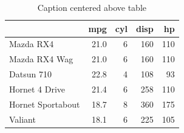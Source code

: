 \documentclass[
  authoryear,
  preprint,
  3p,
  twocolumn]{elsarticle}
\begin{document}
\begin{longtable}[]{@{}lrrrr@{}}

\caption{\label{tbl-simple}Caption centered above table}

\tabularnewline

\toprule\noalign{}
& mpg & cyl & disp & hp \\
\midrule\noalign{}
\endhead
\bottomrule\noalign{}
\endlastfoot
Mazda RX4 & 21.0 & 6 & 160 & 110 \\
Mazda RX4 Wag & 21.0 & 6 & 160 & 110 \\
Datsun 710 & 22.8 & 4 & 108 & 93 \\
Hornet 4 Drive & 21.4 & 6 & 258 & 110 \\
Hornet Sportabout & 18.7 & 8 & 360 & 175 \\
Valiant & 18.1 & 6 & 225 & 105 \\

\end{longtable}


\renewcommand\refname{Referencias}
  
\end{document}
